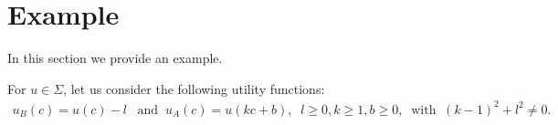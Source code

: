 \documentclass[a4paper,report, 11pt]{article}
\newtheorem{pro}{Proposition}[section]
\def\l{\lambda}
\def\cY{\mathcal{Y}}
\def\be{\begin{eqnarray}}
\def\ee{\end{eqnarray}}
\begin{document}
%
%
%
%
%
%
%
%
%
%
%
%
\section{Example}\label{sec:examples}

In this section we provide an example.

For $u\in \Sigma$, let us consider the following utility functions:
\be\label{ex}
u_B(c)=u(c)-l\;\;\;\mbox{and}\;\;u_A(c)=u(kc+b),\;\; l \geq 0, k\geq 1, b\geq 0, \;\;\mbox{with}\;\;{(k-1)^2+l^2\ne 0}.
\ee
\end{document}
